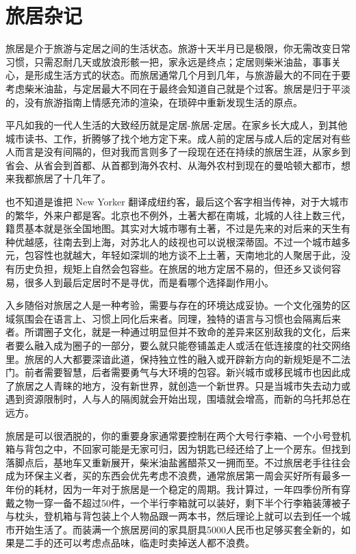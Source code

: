 \documentclass[
  letterpaper,
  DIV=11,
  numbers=noendperiod]{scrreprt}
\begin{document}
\section{旅居杂记}\label{ux65c5ux5c45ux6742ux8bb0}

旅居是介于旅游与定居之间的生活状态。旅游十天半月已是极限，你无需改变日常习惯，只需忍耐几天或放浪形骸一把，家永远是终点；定居则柴米油盐，事事关心，是形成生活方式的状态。而旅居通常几个月到几年，与旅游最大的不同在于要考虑柴米油盐，与定居最大不同在于最终会知道自己就是个过客。旅居是归于平淡的，没有旅游指南上情感充沛的渲染，在琐碎中重新发现生活的原点。

平凡如我的一代人生活的大致经历就是定居-旅居-定居。在家乡长大成人，到其他城市读书、工作，折腾够了找个地方定下来。成人前的定居与成人后的定居对有些人而言是没有间隔的，但对我而言则多了一段现在还在持续的旅居生涯，从家乡到省会、从省会到首都、从首都到海外农村、从海外农村到现在的曼哈顿大都市，想来我都旅居了十几年了。

也不知道是谁把 New Yorker
翻译成纽约客，最后这个客字相当传神，对于大城市的繁华，外来户都是客。北京也不例外，土著大都在南城，北城的人往上数三代，籍贯基本就是张全国地图。其实对大城市哪有土著，不过是先来的对后来的天生有种优越感，往南去到上海，对苏北人的歧视也可以说根深蒂固。不过一个城市越多元，包容性也就越大，年轻如深圳的地方谈不上土著，天南地北的人聚居于此，没有历史负担，规矩上自然会包容些。在旅居的地方定居不易的，但还乡又谈何容易，很多人到最后定居时不是寻优，而是看哪个选择副作用小。

入乡随俗对旅居之人是一种考验，需要与存在的环境达成妥协。一个文化强势的区域氛围会在语言上、习惯上同化后来者。同理，独特的语言与习惯也会隔离后来者。所谓圈子文化，就是一种通过明显但并不致命的差异来区别敌我的文化，后来者要么融入成为圈子的一部分，要么就只能卷铺盖走人或活在低连接度的社交网络里。旅居的人大都要深谙此道，保持独立性的融入或开辟新方向的新规矩是不二法门。前者需要智慧，后者需要勇气与大环境的包容。新兴城市或移民城市也因此成了旅居之人青睐的地方，没有新世界，就创造一个新世界。只是当城市失去动力或遇到资源限制时，人与人的隔阂就会开始出现，围墙就会增高，而新的乌托邦总在远方。

旅居是可以很洒脱的，你的重要身家通常要控制在两个大号行李箱、一个小号登机箱与背包之中，不回家可能是无家可归，因为钥匙已经还给了上一个房东。但找到落脚点后，基地车又重新展开，柴米油盐酱醋茶又一拥而至。不过旅居老手往往会成为环保主义者，买的东西会优先考虑不浪费，通常旅居第一周会买好所有最多一年份的耗材，因为一年对于旅居是一个稳定的周期。我计算过，一年四季份所有穿戴之物一穿一备不超过50件，一个半行李箱就可以装好，剩下半个行李箱装薄被子与枕头，登机箱与背包装上个人物品跟一两本书，然后理论上就可以去到任一个城市开始生活了。而装满一个旅居房间的家具厨具5000人民币也足够买套全新的，如果是二手的还可以考虑点品味，临走时卖掉送人都不浪费。
\end{document}
